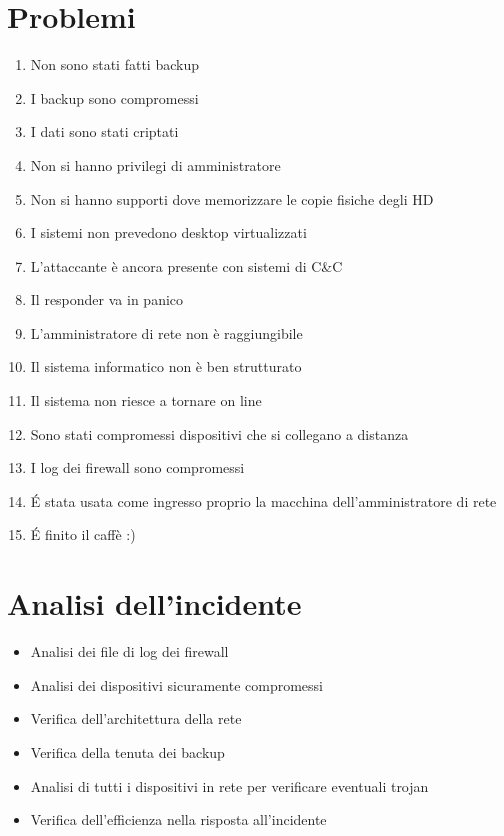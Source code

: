 \section{Problemi}
\begin{enumerate}
    \item Non sono stati fatti backup
    \item I backup sono compromessi
    \item I dati sono stati criptati
    \item Non si hanno privilegi di amministratore
    \item Non si hanno supporti dove memorizzare le copie fisiche degli HD
    \item I sistemi non prevedono desktop virtualizzati
    \item L’attaccante è ancora presente con sistemi di C\&C
    \item Il responder va in panico
    \item L’amministratore di rete non è raggiungibile
    \item Il sistema informatico non è ben strutturato
    \item Il sistema non riesce a tornare on line
    \item Sono stati compromessi dispositivi che si collegano a distanza
    \item I log dei firewall sono compromessi
    \item \'E stata usata come ingresso proprio la macchina dell’amministratore di rete
    \item \'E finito il caffè :)
\end{enumerate}

\section{Analisi dell'incidente}
\begin{itemize}
    \item Analisi dei file di log dei firewall
    \item Analisi dei dispositivi sicuramente compromessi
    \item Verifica dell’architettura della rete
    \item Verifica della tenuta dei backup
    \item Analisi di tutti i dispositivi in rete per verificare eventuali trojan
    \item Verifica dell’efficienza nella risposta all’incidente
\end{itemize}